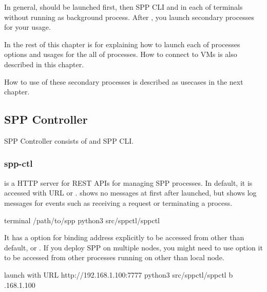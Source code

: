 \documentclass[a4paper,11pt,openany,oneside,english]{sphinxmanual}
\begin{document}
In general,  should be launched first, then SPP CLI and
 in each of terminals without running as background process.
After , you launch secondary processes for your usage.

In the rest of this chapter is for explaining how to launch each of processes
options and usages for the all of processes.
How to connect to VMs is also described in this chapter.

How to use of these secondary processes is described as usecases
in the next chapter.


\subsection{SPP Controller}
\label{\detokenize{gsg/howto_use:spp-controller}}\label{\detokenize{gsg/howto_use:spp-gsg-howto-controller}}
SPP Controller consists of  and SPP CLI.


\subsubsection{spp-ctl}
\label{\detokenize{gsg/howto_use:spp-ctl}}
 is a HTTP server for REST APIs for managing SPP
processes. In default, it is accessed with URL 
or .
 shows no messages at first after launched, but shows
log messages for events such as receiving a request or terminating
a process.

\begin{sphinxVerbatim}[commandchars=\\\{\},formatcom=\footnotesize]
 terminal 
  /path/to/spp
 python3 src/spp\PYGZhy{}ctl/spp\PYGZhy{}ctl
\end{sphinxVerbatim}

It has a option  for binding address explicitly to be accessed
from other than default,  or .
If you deploy SPP on multiple nodes, you might need to use  option
it to be accessed from other processes running on other than local node.

\begin{sphinxVerbatim}[commandchars=\\\{\},formatcom=\footnotesize]
 launch with URL http://192.168.1.100:7777
 python3 src/spp\PYGZhy{}ctl/spp\PYGZhy{}ctl \PYGZhy{}b .168.1.100
\end{sphinxVerbatim}
\end{document}
